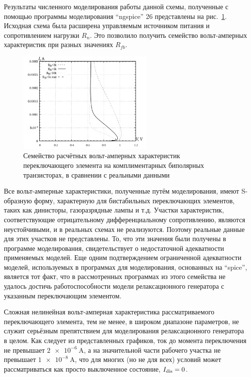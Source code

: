 Результаты численного моделирования работы данной схемы, полученные с помощью
программы моделирования ``ngspice'' 26 представлены на рис.~\ref{atu:f:relax3d_sw_vah}.
Исходная схема была расширена управляемым источником питания и сопротивлением нагрузки $R_n$.
Это позволило получить семейство вольт-амперных характеристик при разных значениях $R_{fb}$.

\begin{figure}[htb!]
  \centerline{\includegraphics[width=0.6\textwidth]{p/relax3d_sw_va.png} }
  \caption{Семейство расчётных вольт-амперных характеристик переключающего элемента на комплиментарных биполярных транзисторах,
  в сравнении с реальными данными}
  \label{atu:f:relax3d_sw_vah}
\end{figure}

Все вольт-амперные характеристики, полученные путём моделирования,
имеют S-образную форму, характерную для бистабильных
переключающих элементов, таких как динисторы, газоразрядные лампы и т.д.
Участки характеристик, соответствующие отрицательному
дифференциальному сопротивлению, являются неустойчивыми,
и в реальных схемах не реализуются.
Поэтому реальные данные для этих участков не представлены.
То, что эти значения
были получены в программе моделирования,
свидетельствует о недостаточной адекватности применяемых моделей.
Еще одним подтверждением ограниченной адекватности моделей, используемых
в программах для моделирования, основанных на ``spice'',
является тот факт, что в рассмотренных программах из этого семейства
не удалось достичь работоспособности модели релаксационного генератора
с указанным переключающим элементом.

Сложная нелинейная вольт-амперная характеристика рассматриваемого переключающего элемента,
тем не менее, в широком диапазоне параметров,
не служит серьёзным препятствием для моделирования
релаксационного генератора в целом.
Как следует из представленных графиков, ток до момента переключения
не превышает $\SI{2e-6}{\ampere}$, а на значительной части рабочего участка
не превышает $\SI{1e-8}{\ampere}$, что для многих (но не для всех)
условий может рассматриваться как просто выключенное состояние, $I_\mathrm{dis}=0$.


